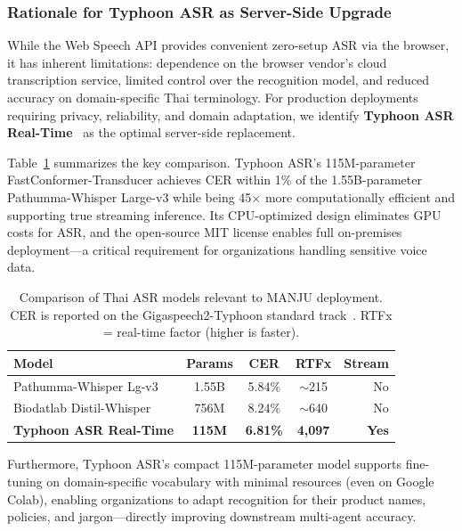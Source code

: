 \documentclass[10pt, a4paper, twocolumn]{article}
\begin{document}
\subsubsection{Rationale for Typhoon ASR as Server-Side Upgrade}
While the Web Speech API provides convenient zero-setup ASR via the browser, it has inherent limitations: dependence on the browser vendor's cloud transcription service, limited control over the recognition model, and reduced accuracy on domain-specific Thai terminology. For production deployments requiring privacy, reliability, and domain adaptation, we identify \textbf{Typhoon ASR Real-Time}~\cite{sirichotedumrong2026typhoonasr} as the optimal server-side replacement.

Table~\ref{tab:asr_comparison} summarizes the key comparison. Typhoon ASR's 115M-parameter FastConformer-Transducer achieves CER within 1\% of the 1.55B-parameter Pathumma-Whisper Large-v3 while being 45$\times$ more computationally efficient and supporting true streaming inference. Its CPU-optimized design eliminates GPU costs for ASR, and the open-source MIT license enables full on-premises deployment---a critical requirement for organizations handling sensitive voice data.

\begin{table}[t]
    \centering
    \caption{Comparison of Thai ASR models relevant to MANJU deployment. CER is reported on the Gigaspeech2-Typhoon standard track~\cite{sirichotedumrong2026typhoonasr}. RTFx = real-time factor (higher is faster).}
    \label{tab:asr_comparison}
    \small
    \begin{tabular}{@{}lcccr@{}}
        \toprule
        \textbf{Model} & \textbf{Params} & \textbf{CER} & \textbf{RTFx} & \textbf{Stream} \\
        \midrule
        Pathumma-Whisper Lg-v3 & 1.55B & 5.84\% & $\sim$215 & No \\
        Biodatlab Distil-Whisper & 756M & 8.24\% & $\sim$640 & No \\
        \textbf{Typhoon ASR Real-Time} & \textbf{115M} & \textbf{6.81\%} & \textbf{4{,}097} & \textbf{Yes} \\
        \bottomrule
    \end{tabular}
\end{table}

\noindent Furthermore, Typhoon ASR's compact 115M-parameter model supports fine-tuning on domain-specific vocabulary with minimal resources (even on Google Colab), enabling organizations to adapt recognition for their product names, policies, and jargon---directly improving downstream multi-agent accuracy.
\end{document}
